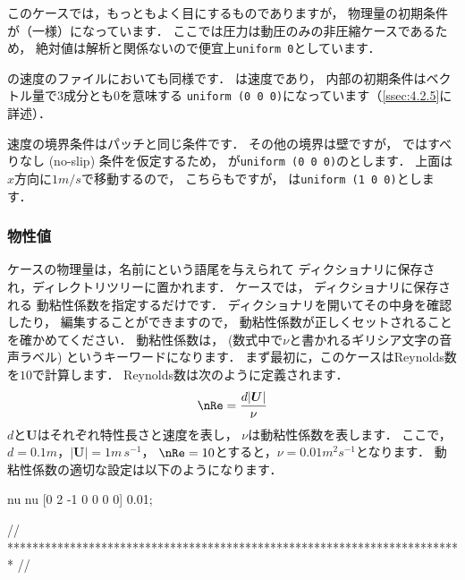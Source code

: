 このケースでは，もっともよく目にするものでありますが，
物理量の初期条件が（一様）になっています．
ここでは圧力は動圧のみの非圧縮ケースであるため，
絶対値は解析と関係ないので便宜上\texttt{uniform 0}としています．

の速度のファイルにおいても同様です．
は速度であり，
内部の初期条件はベクトル量で3成分とも$0$を意味する
\texttt{uniform (0 0 0)}になっています（\autoref{ssec:4.2.5}に詳述）．

速度の境界条件はパッチと同じ条件です．
その他の境界は壁ですが，
ではすべりなし (no-slip) 条件を仮定するため，
%
%
が\texttt{uniform (0 0 0)}のとします．
上面は$x$方向に$1\unit{m/s}$で移動するので，
こちらもですが，
は\texttt{uniform (1 0 0)}とします．

\subsubsection{物性値}
\label{sssec:2.1.1.3}
ケースの物理量は，名前にという語尾を与えられて
ディクショナリに保存され，ディレクトリツリーに置かれます．
%
%
ケースでは，
%
%
ディクショナリに保存される
動粘性係数を指定するだけです．
ディクショナリを開いてその中身を確認したり，
編集することができますので，
%
動粘性係数が正しくセットされることを確かめてください．
動粘性係数は， (数式中で$\nu$と書かれるギリシア文字の音声ラベル)
というキーワードになります．
まず最初に，このケースはReynolds数を$10$で計算します．
%
Reynolds数は次のように定義されます．
\begin{align}
 \label{eq:2.1}
 \nRe = \frac{d|\bm{U}|}{\nu}
\end{align}
$d$と$\bm{U}$はそれぞれ特性長さと速度を表し，
$\nu$は動粘性係数を表します．
ここで，$d = 0.1\unit{m}$，$|\bm{U}| = 1\unit{m\,s^{-1}}$，
$\nRe = 10$とすると，$\nu = 0.01\unit{m^{2}s^{-1}}$となります．
動粘性係数の適切な設定は以下のようになります．
\begin{OFverbatim}[file, linenum=17]

nu              nu [0 2 -1 0 0 0 0] 0.01;


// ************************************************************************* //
\end{OFverbatim}

